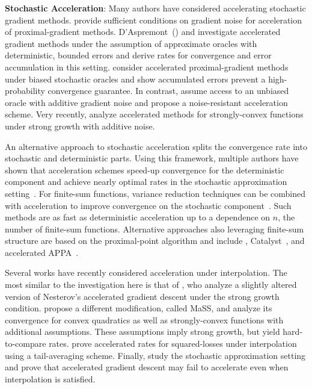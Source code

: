 \noindent \textbf{Stochastic Acceleration}: 
Many authors have considered accelerating stochastic gradient methods.
\citet{schmidt2011convergence} provide sufficient conditions on gradient noise for acceleration of proximal-gradient methods.
D'Aspremont~(\citeyear{aspremont2008approximate}) and \citet{devolder2014first} investigate accelerated gradient methods under the assumption of approximate oracles with deterministic, bounded errors and derive rates for convergence and error accumulation in this setting.
\citet{honorio2012biased} consider accelerated proximal-gradient methods under biased stochastic oracles and show accumulated errors prevent a high-probability convergence guarantee. 
In contrast, \citet{cohen2018acceleration} assume access to an unbiased oracle with additive gradient noise and propose a noise-resistant acceleration scheme.
Very recently, \citet{chen2020understanding} analyze accelerated methods for strongly-convex functions under strong growth with additive noise. 

An alternative approach to stochastic acceleration splits the convergence rate into stochastic and deterministic parts.
Using this framework, multiple authors have shown that acceleration schemes speed-up convergence for the deterministic component and achieve nearly optimal rates in the stochastic approximation setting~\citep{ghadimi2012optimal1, ghadimi2013optimal2, hu2009accelerated}.
For finite-sum functions, variance reduction techniques can be combined with acceleration to improve convergence on the stochastic component~\citep{allen-zhu2017katyusha, defazio2016pointSaga, allen-zhou2018katyushax, tang2018restkatyusha, shang2018asvrg, kovalev2020loopless}.
Such methods are as fast as deterministic acceleration up to a dependence on \( n \), the number of finite-sum functions.
Alternative approaches also leveraging finite-sum structure are based on the proximal-point algorithm and include , Catalyst~\citep{lin2015catalyst}, and accelerated APPA~\citep{frostig2015unregularizing}.

Several works have recently considered acceleration under interpolation.
The most similar to the investigation here is that of \citet{vaswani2019fast}, who analyze a slightly altered version of Nesterov's accelerated gradient descent under the strong growth condition. 
\citet{liu2020accelerating} propose a different modification, called MaSS, and analyze its convergence for convex quadratics as well as strongly-convex functions with additional assumptions. 
These assumptions imply strong growth, but yield hard-to-compare rates. 
\citet{jain2018accelerating} prove accelerated rates for squared-losses under interpolation using a tail-averaging scheme. 
Finally, \citet{assran2020convergence} study the stochastic approximation setting and prove that accelerated gradient descent may fail to accelerate even when interpolation is satisfied.\\

